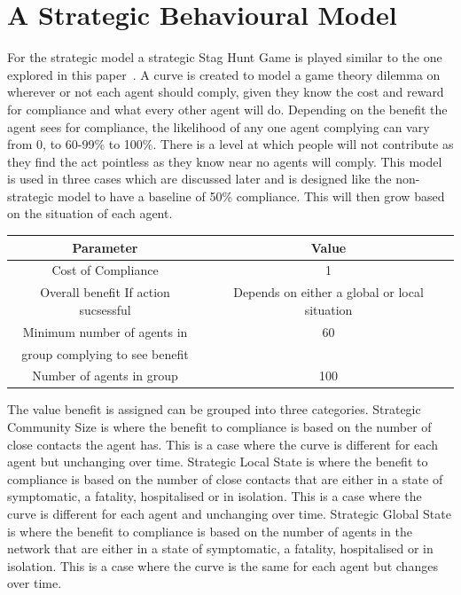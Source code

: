 \documentclass{article}
\begin{document}
\section{A Strategic Behavioural Model}
For the strategic model a strategic Stag Hunt Game is played similar to the one explored in this paper~\cite{pacheco_santos_souza_2014}. A curve is created to model a game theory dilemma on wherever or not each agent should comply, given they know the cost and reward for compliance and what every other agent will do. Depending on the benefit the agent sees for compliance, the likelihood of any one agent complying can vary from 0, to 60-99\% to 100\%. There is a level at which people will not contribute as they find the act pointless as they know near no agents will comply. This model is used in three cases which are discussed later and is designed like the non-strategic model to have a baseline of 50\% compliance. This will then grow based on the situation of each agent.\newline

\begin{tabular}{|c|c|}
\hline
Parameter & Value \\ \hline
Cost of Compliance & 1 \\ \hline
Overall benefit If action sucsessful & Depends on either a global or local situation\\ \hline
Minimum number of agents in & 60\\ 
group complying to see benefit & \\\hline
Number of agents in group & 100\\ \hline
\end{tabular}
\newline

The value benefit is assigned can be grouped into three categories. Strategic Community Size is where the benefit to compliance is based on the number of close contacts the agent has. This is a case where the curve is different for each agent but unchanging over time. Strategic Local State is where the benefit to compliance is based on the number of close contacts that are either in a state of symptomatic, a fatality, hospitalised or in isolation. This is a case where the curve is different for each agent and unchanging over time. Strategic Global State is where the benefit to compliance is based on the number of agents in the network that are either in a state of symptomatic, a fatality, hospitalised or in isolation. This is a case where the curve is the same for each agent but changes over time. \newline
\end{document}
